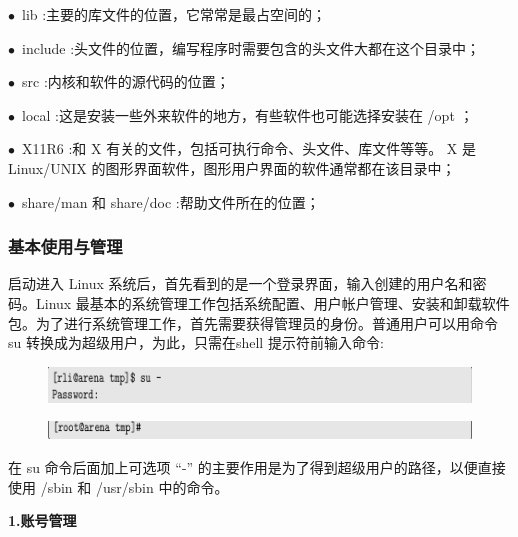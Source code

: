 \documentclass[12pt，a4paper]{article}
\numberwithin{equation}{section}
\begin{document}
$\bullet$~lib :主要的库文件的位置，它常常是最占空间的；

$\bullet$~include :头文件的位置，编写程序时需要包含的头文件大都在这个目录中；

$\bullet$~src :内核和软件的源代码的位置；

$\bullet$~local :这是安装一些外来软件的地方，有些软件也可能选择安装在 /opt ；

$\bullet$~X11R6 :和 X 有关的文件，包括可执行命令、头文件、库文件等等。 X 是 Linux/UNIX 的图形界面软件，图形用户界面的软件通常都在该目录中；

$\bullet$~share/man 和 share/doc :帮助文件所在的位置；

\subsubsection{基本使用与管理}
启动进入 Linux 系统后，首先看到的是一个登录界面，输入创建的用户名和密码。Linux 最基本的系统管理工作包括系统配置、用户帐户管理、安装和卸载软件包。为了进行系统管理工作，首先需要获得管理员的身份。普通用户可以用命令 su 转换成为超级用户，为此，只需在shell 提示符前输入命令:
\begin{figure}[H]
\centering
\includegraphics[scale=0.6]{./figures/21.png}
\end{figure}

\begin{figure}[H]
\centering
\includegraphics[scale=0.6]{./figures/22.png}
\end{figure}
在 su 命令后面加上可选项 “-” 的主要作用是为了得到超级用户的路径，以便直接使用 /sbin 和 /usr/sbin 中的命令。

\textbf{1.账号管理}
\end{document}
